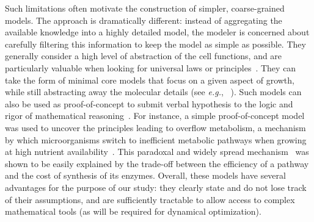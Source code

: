 Such limitations often motivate the construction of simpler, coarse-grained models.
The approach is dramatically different: instead of aggregating the available knowledge into a highly detailed model, the modeler is concerned about carefully filtering this information to keep the model as simple as possible.
They generally consider a high level of abstraction of the cell functions, and are particularly valuable when looking for universal laws or principles~\cite{scott_bacterial_2011,scott_interdependence_2010,scott_emergence_2014}.
They can take the form of minimal core models that focus on a given aspect of growth, while still abstracting away the molecular details (see \textit{e.g.}, ~\cite{spiesser_size_2012}).
Such models can also be used as proof-of-concept to submit verbal hypothesis to the logic and rigor of mathematical reasoning~\cite{servedio_not_2014}.
For instance, a simple proof-of-concept model was used to uncover the principles leading to overflow metabolism, a mechanism by which microorganisms switch to inefficient metabolic pathways when growing at high nutrient availability~\cite{molenaar_shifts_2009}.
This paradoxal and widely spread mechanism~\cite{dijken_kinetics_1993,vemuri_overflow_2006,mckeehan_glycolysis_1982,hsu_cancer_2008} was shown to be easily explained by the trade-off between the efficiency of a pathway and the cost of synthesis of its enzymes.
Overall, these models have several advantages for the purpose of our study: they clearly state and do not lose track of their assumptions, and are sufficiently tractable to allow access to complex mathematical tools (as will be required for dynamical optimization).



